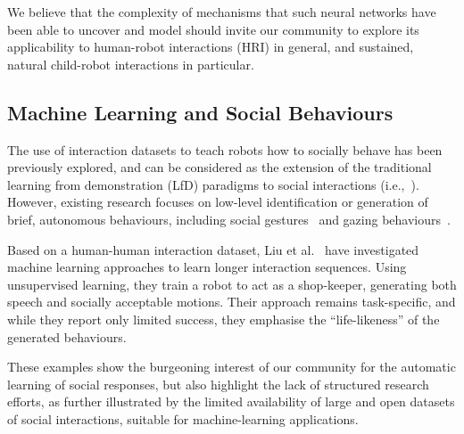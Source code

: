 \documentclass{article}
\newcommand{\etal}{et al.\xspace}
\begin{document}
We believe
that the complexity of mechanisms that such neural networks have been able to
uncover and model should invite our community to explore its applicability to
human-robot interactions (HRI) in general, and sustained, natural child-robot
interactions in particular.

\subsection*{Machine Learning and Social Behaviours}

The use of interaction datasets to teach robots how to socially behave has been
previously explored, and can be considered as the extension of the traditional
learning from demonstration (LfD) paradigms to social interactions
(i.e.,~\cite{nehaniv2007imitation,mohammad2015interaction}). However, existing
research focuses on low-level identification or generation of brief, autonomous behaviours, including social gestures~\cite{nagai2005learning} and
gazing behaviours~\cite{calinon2006teaching}.

Based on a human-human interaction dataset, Liu \etal~\cite{liu2014how} have
investigated machine learning approaches to learn longer interaction sequences.
Using unsupervised learning, they train a robot to act as a shop-keeper,
generating both speech and socially acceptable motions. Their approach remains
task-specific, and while they report only limited success, they emphasise the
``life-likeness'' of the generated behaviours.

These examples show the burgeoning interest of our community for the automatic
learning of social responses, but also highlight the lack of structured
research efforts, as further illustrated by the limited availability of large
and open datasets of social interactions, suitable for machine-learning
applications.
\end{document}
